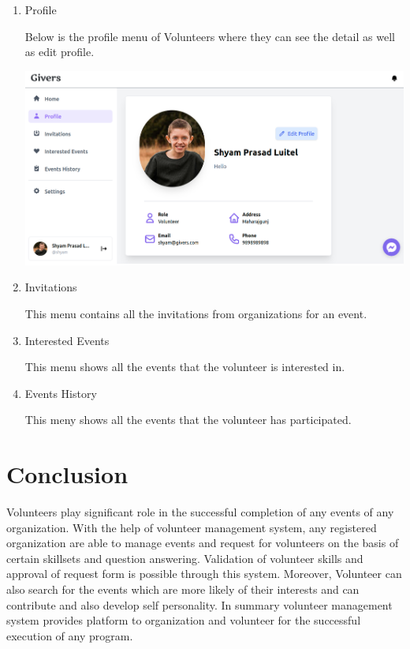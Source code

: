 \documentclass[12pt]{article}
\begin{document}
\begin{enumerate}
\begin{center}
	\end{center}

\clearpage
\clearpage

	\item Profile
	
	Below is the profile menu of Volunteers where they can see the detail as well as edit profile.
	
	\includegraphics[scale = 0.35]{user/user_profile.png}		
	
	\item Invitations
	 
	This menu contains all the invitations from organizations for an event.
	
	\item Interested Events
	
	This menu shows all the events that the volunteer is interested in.
	
	\item Events History
	
	This meny shows all the events that the volunteer has participated.
	
\end{enumerate}

\clearpage
\clearpage

\section{Conclusion}
Volunteers play significant role in the successful completion of any events of any organization. With the help of volunteer management system, any registered organization are able to manage events and request for volunteers on the basis of certain skillsets and question answering. Validation of volunteer skills and approval of request form is possible through this system. Moreover, Volunteer can also search for the events which are more likely of their interests and can contribute and also develop self personality. In summary volunteer management system provides platform to organization and volunteer for the successful execution of any program.
\end{document}
